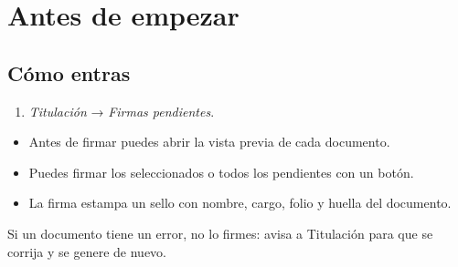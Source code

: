 \section{Antes de empezar}
\subsection*{Cómo entras}
\begin{enumerate}
  \item \emph{Titulación} → \emph{Firmas pendientes}.
\end{enumerate}
\begin{tencuenta}
\begin{itemize}
  \item Antes de firmar puedes abrir la vista previa de cada documento.
  \item Puedes firmar los seleccionados o todos los pendientes con un botón.
  \item La firma estampa un sello con nombre, cargo, folio y huella del documento.
\end{itemize}
\end{tencuenta}
\begin{algosalemal}
Si un documento tiene un error, no lo firmes: avisa a Titulación para que se corrija y se genere de nuevo.
\end{algosalemal}
